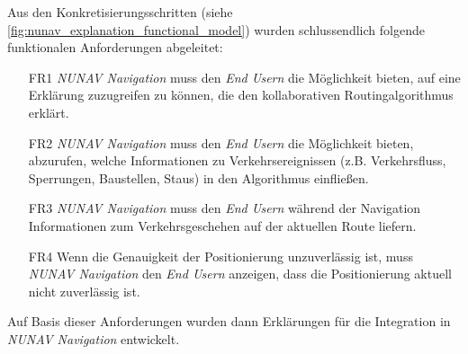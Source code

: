 \newpage

Aus den Konkretisierungsschritten (siehe \autoref{fig:nunav_explanation_functional_model}) wurden schlussendlich folgende funktionalen Anforderungen abgeleitet:

\begin{enumerate}
    \item [FR1] \textit{NUNAV Navigation} muss den \textit{End Usern} die Möglichkeit bieten, auf eine Erklärung zuzugreifen zu können, die den kollaborativen Routingalgorithmus erklärt.
    \item [FR2] \textit{NUNAV Navigation} muss den \textit{End Usern} die Möglichkeit bieten, abzurufen, welche Informationen zu Verkehrsereignissen (z.B. Verkehrsfluss, Sperrungen, Baustellen, Staus) in den Algorithmus einfließen.
    \item [FR3] \textit{NUNAV Navigation} muss den \textit{End Usern} während der Navigation Informationen zum Verkehrsgeschehen auf der aktuellen Route liefern.
    \item [FR4] Wenn die Genauigkeit der Positionierung unzuverlässig ist, muss \textit{NUNAV Navigation} den \textit{End Usern} anzeigen, dass die Positionierung aktuell nicht zuverlässig ist.
\end{enumerate}

Auf Basis dieser Anforderungen wurden dann Erklärungen für die Integration in \textit{NUNAV Navigation} entwickelt.
